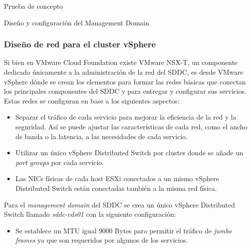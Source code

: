 \begin{section}{Prueba de concepto}
\begin{subsection}{Diseño y configuración del Management Domain}
    \subsubsection{Diseño de red para el cluster vSphere}
    Si bien en VMware Cloud Foundation existe VMware NSX-T, un componente dedicado únicamente a la administración de la red del SDDC, es desde VMware vSphere dónde se crean los elementos para formar las redes básicas que conectan los principales componentes del SDDC y para entregar y configurar sus servicios. Estas redes se configuran en base a los siguientes aspectos: 
    \begin{itemize}
        \item Separar el tráfico de cada servicio para mejorar la eficiencia de la red y la seguridad. Así se puede ajustar las características de cada red, como el ancho de banda o la latencia, a las necesidades de cada servicio.
        \item Utilizar un único vSphere Distributed Switch por cluster donde se añade un \textit{port groups} por cada servicio.
        \item Las NICs físicas de cada host ESXi conectados a un mismo vSphere Distributed Switch están conectadas también a la misma red física.
    \end{itemize}
    Para el \textit{management domain} del SDDC se crea un único vSphere Distributed Switch llamado \textit{sddc-vds01} con la siguiente configuración:
    \begin{itemize}
        
        \item Se establece un MTU igual 9000 Bytes para permitir el tráfico de \textit{jumbo frames} ya que son requeridos por algunos de los servicios.
        

\end{itemize}
\end{subsection}
\end{section}
